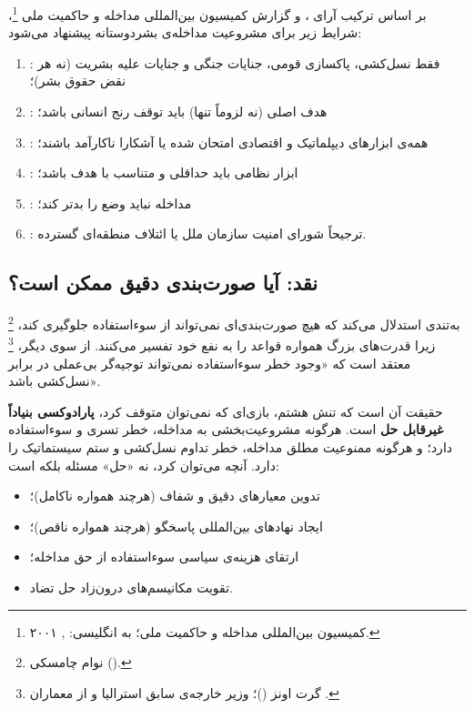 \begin{tcolorbox}[legalbox,
	title={شرایط محدودسازی حق مداخله: پیشنهاد ترکیبی}]
	بر اساس ترکیب آرای ،  و
	گزارش کمیسیون بین‌المللی مداخله و حاکمیت ملی%
	\footnote{کمیسیون بین‌المللی مداخله و حاکمیت ملی؛ به انگلیسی:
		, ۲۰۰۱.}،
	شرایط زیر برای مشروعیت مداخله‌ی بشردوستانه پیشنهاد
	می‌شود:
	
	\begin{enumerate}[label=\textbf{\arabic*.}, nosep, rightmargin=1em]
		\item {}: فقط نسل‌کشی، پاکسازی قومی،
		جنایات جنگی و جنایات علیه بشریت (نه هر نقض حقوق بشر)؛
		\item {}: هدف اصلی (نه لزوماً تنها) باید توقف
		رنج انسانی باشد؛
		\item {}: همه‌ی ابزارهای دیپلماتیک و اقتصادی
		امتحان شده یا آشکارا ناکارآمد باشند؛
		\item {}: ابزار نظامی باید حداقلی و متناسب
		با هدف باشد؛
		\item {}: مداخله نباید وضع را بدتر
		کند؛
		\item {}: ترجیحاً شورای امنیت سازمان ملل
		یا ائتلاف منطقه‌ای گسترده.
	\end{enumerate}
\end{tcolorbox}

\subsection{نقد: آیا صورت‌بندی دقیق ممکن است؟}
\label{subsec:ch02-t8-critique}

%
\footnote{نوام چامسکی ().}%
به‌تندی استدلال می‌کند که هیچ صورت‌بندی‌ای نمی‌تواند از سوءاستفاده
جلوگیری کند، زیرا قدرت‌های بزرگ همواره قواعد را به نفع خود
تفسیر می‌کنند.
از سوی دیگر،
%
\footnote{%
	گرت اونز ()؛%
	وزیر خارجه‌ی سابق استرالیا و از معماران .%
}%
معتقد است که «وجود خطر سوءاستفاده نمی‌تواند توجیه‌گر بی‌عملی
در برابر نسل‌کشی باشد».

\begin{tcolorbox}[mybox,
	title={نتیجه‌ی تحلیلی: پارادوکس غیرقابل حل}]
	حقیقت آن است که تنش هشتم، بازی‌ای که نمی‌توان متوقف کرد،
	\textbf{پارادوکسی بنیاداً غیرقابل حل} است. هرگونه مشروعیت‌بخشی
	به مداخله، خطر تسری و سوءاستفاده دارد؛ و هرگونه ممنوعیت مطلق
	مداخله، خطر تداوم نسل‌کشی و ستم سیستماتیک را دارد. آنچه می‌توان
	کرد، نه «حل» مسئله بلکه  است:
	\begin{itemize}[nosep, rightmargin=1em]
		\item تدوین معیارهای دقیق و شفاف (هرچند همواره ناکامل)؛
		\item ایجاد نهادهای بین‌المللی پاسخگو (هرچند همواره ناقص)؛
		\item ارتقای هزینه‌ی سیاسی سوءاستفاده از حق مداخله؛
		\item تقویت مکانیسم‌های درون‌زاد حل تضاد.
	\end{itemize}
\end{tcolorbox}


